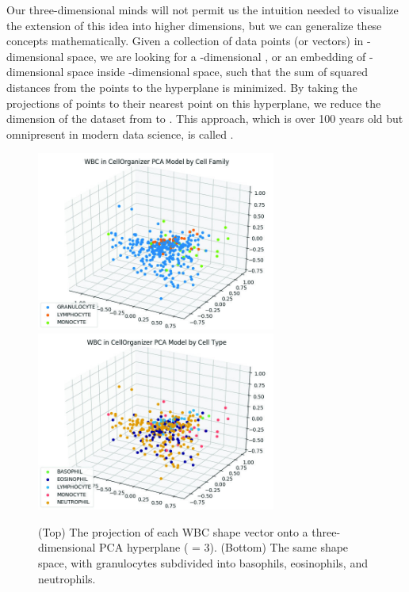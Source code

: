 Our three-dimensional minds will not permit us the intuition needed to visualize the extension of this idea into higher dimensions, but we can generalize these concepts mathematically. Given a collection of  data points (or vectors) in -dimensional space, we are looking for a -dimensional , or an embedding of -dimensional space inside -dimensional space, such that the sum of squared distances from the points to the hyperplane is minimized. By taking the projections of points to their nearest point on this hyperplane, we reduce the dimension of the dataset from  to . This approach, which is over 100 years old but omnipresent in modern data science, is called .

\begin{figure}[p]
\centering
\mySfFamily
\includegraphics[width = 0.7\textwidth]{../images_CMYK/cellorg_pca_graph}\\[4ex]
\includegraphics[width = 0.7\textwidth]{../images_CMYK/cellorg_pca_graph_cell}
\caption{(Top) The projection of each WBC shape vector onto a three-dimensional PCA hyperplane ( = 3). (Bottom) The same shape space, with granulocytes subdivided into basophils, eosinophils, and neutrophils.}
\label{fig:cellorg_pca_graph}
\end{figure}

